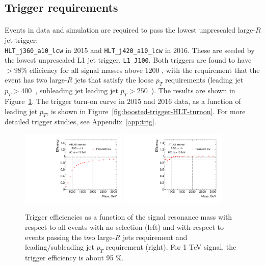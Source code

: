 \subsection{Trigger requirements}
\label{evt-sel:trig}

\paragraph{}
Events in data and simulation are required to pass the lowest unprescaled large-$R$ jet trigger: \\
\verb|HLT_j360_a10_lcw| in 2015 and \verb|HLT_j420_a10_lcw| in 2016. These are seeded by the lowest unprescaled L1 jet trigger, \texttt{L1\_J100}. Both triggers are found to have $>98\%$ efficiency for all signal masses above 1200 \GeV, with the requirement that the event has two large-$R$ jets that satisfy the loose $p_{T}$ requirements (leading jet $p_{T} > 400$~\GeV, subleading jet leading jet $p_{T} > 250$~\GeV). The results are shown in Figure~\ref{fig:boosted-trigger-HLT}. The trigger turn-on curve in 2015 and 2016 data, as a function of leading jet $p_{T}$, is shown in Figure~\ref{fig:boosted-trigger-HLT-turnon}. For more detailed trigger studies, see Appendix~\ref{app:trig}.

\begin{figure}[htbp!]
\begin{center}
\includegraphics[angle=270, width=0.45\textwidth]{./figures/boosted/Trigger/trig_Moriond_Efficiency_PreSel.pdf}
\includegraphics[angle=270, width=0.45\textwidth]{./figures/boosted/Trigger/trig_Moriond_Efficiency_All.pdf}
  \caption{Trigger efficiencies as a function of the signal resonance mass with respect to all events with no selection (left) and with respect to events passing the two large-$R$ jets requirement and leading/subleading jet $p_{T}$ requirement (right). For 1 TeV signal, the trigger efficiency is about 95 \%.}
  \label{fig:boosted-trigger-HLT}
\end{center}
\end{figure}

